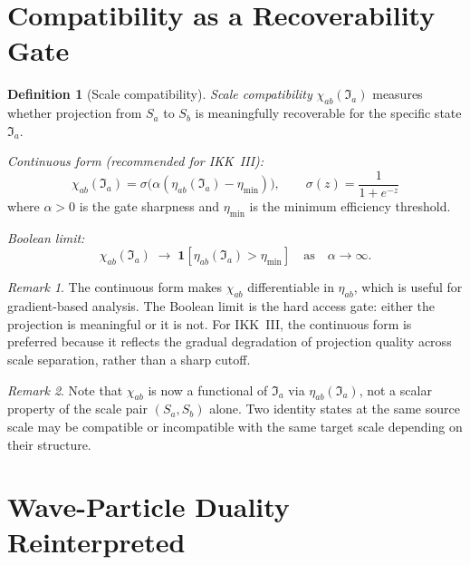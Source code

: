 \documentclass[12pt, a4paper]{article}
\theoremstyle{definition}
\newtheorem{defn}{Definition}[section]
\theoremstyle{plain}
\theoremstyle{remark}
\newtheorem{remark}{Remark}[section]
\newcommand{\Ia}{\mathfrak{I}_a}
\newcommand{\Sa}{S_a}
\newcommand{\Sb}{S_b}
\newcommand{\chiab}{\chi_{ab}}
\newcommand{\etaab}{\eta_{ab}}
\newcommand{\etamin}{\eta_{\min}}
\begin{document}
\section{Compatibility as a Recoverability Gate}
\label{sec:compat}

\begin{defn}[Scale compatibility]
\label{def:compat}
\emph{Scale compatibility} $\chiab(\Ia)$ measures whether projection
from $\Sa$ to $\Sb$ is meaningfully recoverable for the specific
state $\Ia$.

\textit{Continuous form (recommended for IKK~III):}
\[
  \boxed{
    \chiab(\Ia)
    = \sigma\!\bigl(\alpha(\etaab(\Ia) - \etamin)\bigr),
    \qquad
    \sigma(z) = \frac{1}{1+e^{-z}}
  }
\]
where $\alpha > 0$ is the gate sharpness and $\etamin$ is the
minimum efficiency threshold.

\textit{Boolean limit:}
\[
  \chiab(\Ia)
  \;\to\; \mathbf{1}[\etaab(\Ia) > \etamin]
  \quad\text{as}\quad
  \alpha \to \infty.
\]
\end{defn}

\begin{remark}
The continuous form makes $\chiab$ differentiable in $\etaab$,
which is useful for gradient-based analysis.
The Boolean limit is the hard access gate: either the projection
is meaningful or it is not.
For IKK~III, the continuous form is preferred because it reflects
the gradual degradation of projection quality across scale
separation, rather than a sharp cutoff.
\end{remark}

\begin{remark}
Note that $\chiab$ is now a functional of $\Ia$ via $\etaab(\Ia)$,
not a scalar property of the scale pair $(\Sa,\Sb)$ alone.
Two identity states at the same source scale may be compatible
or incompatible with the same target scale depending on their
structure.
\end{remark}


\section{Wave-Particle Duality Reinterpreted}
\label{sec:duality}
\end{document}
